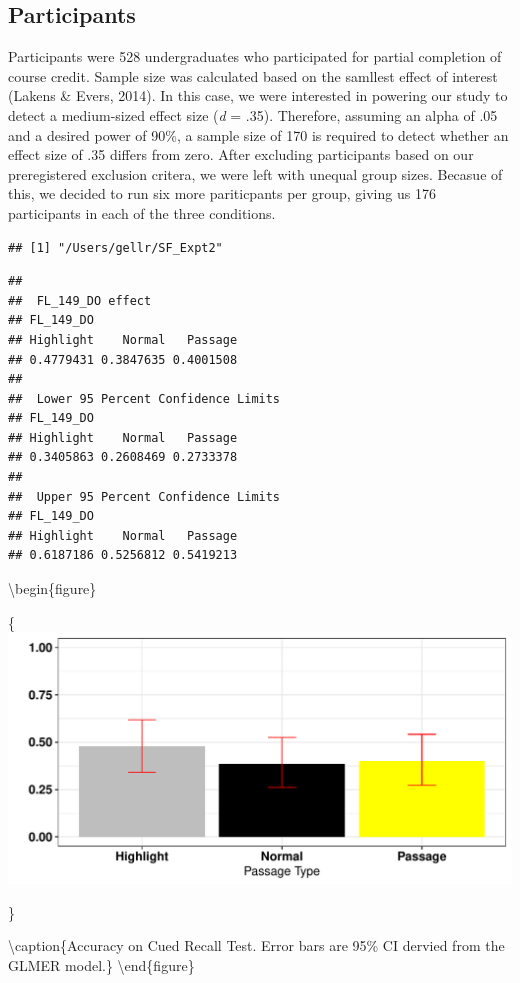 \documentclass[doc]{apa6}
\begin{document}
\hypertarget{participants-1}{%
\subsection{Participants}\label{participants-1}}

Participants were 528 undergraduates who participated for partial completion of course credit. Sample size was calculated based on the samllest effect of interest (Lakens \& Evers, 2014). In this case, we were interested in powering our study to detect a medium-sized effect size (\emph{d} = .35). Therefore, assuming an alpha of .05 and a desired power of 90\%, a sample size of 170 is required to detect whether an effect size of .35 differs from zero. After excluding participants based on our preregistered exclusion critera, we were left with unequal group sizes. Becasue of this, we decided to run six more pariticpants per group, giving us 176 participants in each of the three conditions.

\begin{verbatim}
## [1] "/Users/gellr/SF_Expt2"
\end{verbatim}

\begin{verbatim}
## 
##  FL_149_DO effect
## FL_149_DO
## Highlight    Normal   Passage 
## 0.4779431 0.3847635 0.4001508 
## 
##  Lower 95 Percent Confidence Limits
## FL_149_DO
## Highlight    Normal   Passage 
## 0.3405863 0.2608469 0.2733378 
## 
##  Upper 95 Percent Confidence Limits
## FL_149_DO
## Highlight    Normal   Passage 
## 0.6187186 0.5256812 0.5419213
\end{verbatim}

\textbackslash{}begin\{figure\}

\{\centering \includegraphics{SF_Paper_files/figure-latex/unnamed-chunk-2-1}

\}

\textbackslash{}caption\{Accuracy on Cued Recall Test. Error bars are 95\% CI dervied from the GLMER model.\}\label{fig:unnamed-chunk-2}
\textbackslash{}end\{figure\}
\end{document}
